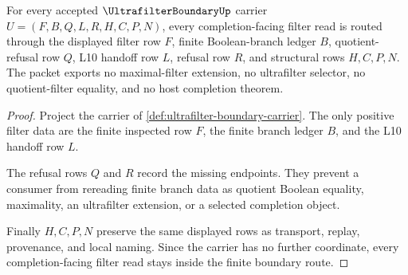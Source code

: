 \begin{theorem}
\label{thm:ultrafilter-boundary-finite-route}
For every accepted $\UltrafilterBoundaryUp$ carrier $U=(F,B,Q,L,R,H,C,P,N)$, every completion-facing filter read is routed through the displayed filter row $F$, finite Boolean-branch ledger $B$, quotient-refusal row $Q$, L10 handoff row $L$, refusal row $R$, and structural rows $H,C,P,N$. The packet exports no maximal-filter extension, no ultrafilter selector, no quotient-filter equality, and no host completion theorem.
\end{theorem}
\begin{proof}
Project the carrier of \autoref{def:ultrafilter-boundary-carrier}. The only positive filter data are the finite inspected row $F$, the finite branch ledger $B$, and the L10 handoff row $L$.

The refusal rows $Q$ and $R$ record the missing endpoints. They prevent a consumer from rereading finite branch data as quotient Boolean equality, maximality, an ultrafilter extension, or a selected completion object.

Finally $H,C,P,N$ preserve the same displayed rows as transport, replay, provenance, and local naming. Since the carrier has no further coordinate, every completion-facing filter read stays inside the finite boundary route.
\end{proof}


\begin{closurestatus}{\UltrafilterBoundaryUp}
  \theoryclosure{\seedClosure}
  \formalstatus{\unformalizedV}
\end{closurestatus}
